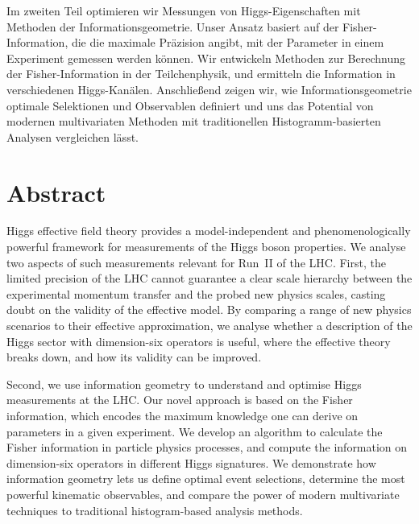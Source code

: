 Im zweiten Teil optimieren wir Messungen von Higgs-Eigenschaften mit
Methoden der Informationsgeometrie. Unser Ansatz basiert auf der
Fisher-Information, die die maximale Pr\"azision angibt, mit der
Parameter in einem Experiment gemessen werden k\"onnen. Wir entwickeln
Methoden zur Berechnung der Fisher-Information in der Teilchenphysik,
und ermitteln die Information in verschiedenen
Higgs-Kan\"alen. Anschlie\ss{}end zeigen wir, wie
Informationsgeometrie optimale Selektionen und Observablen definiert
und uns das Potential von modernen multivariaten Methoden mit
traditionellen Histogramm-basierten Analysen vergleichen l\"asst.



\chapter*{Abstract}


Higgs effective field theory provides a model-independent and
phenomenologically powerful framework for measurements of the Higgs
boson properties. We analyse two aspects of such measurements relevant
for Run~II of the LHC. First, the limited precision of the LHC cannot
guarantee a clear scale hierarchy between the experimental momentum
transfer and the probed new physics scales, casting doubt on the
validity of the effective model. By comparing a range of new physics
scenarios to their effective approximation, we analyse whether a
description of the Higgs sector with dimension-six operators is
useful, where the effective theory breaks down, and how its validity
can be improved.

Second, we use information geometry to understand and optimise Higgs
measurements at the LHC. Our novel approach is based on the Fisher
information, which encodes the maximum knowledge one can derive on
parameters in a given experiment. We develop an algorithm to calculate
the Fisher information in particle physics processes, and compute the
information on dimension-six operators in different Higgs signatures.
We demonstrate how information geometry lets us define optimal event
selections, determine the most powerful kinematic observables, and
compare the power of modern multivariate techniques to traditional
histogram-based analysis methods.
